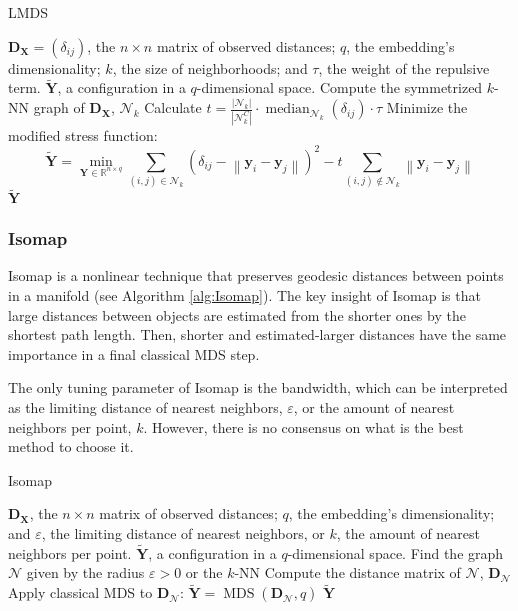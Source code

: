 \begin{algorithm}
    \caption{LMDS}
    \label{alg:LMDS}
    
    \begin{algorithmic}[1]
    \REQUIRE $\mathbf{D_X} = (\delta_{ij})$, the $n \times n$ matrix of observed distances; $q$, the embedding's dimensionality; $k$, the size of neighborhoods; and $\tau$, the weight of the repulsive term.
    \ENSURE $\mathbf{\tilde{Y}}$, a configuration in a $q$-dimensional space.
    \STATE Compute the symmetrized $k$-NN graph of $\mathbf{D_X}$, $\mathcal{N}_k$
    \STATE Calculate $t=\frac{|\mathcal{N}_k|}{\left|\mathcal{N}_k^C\right|} \cdot \operatorname{median}_{\mathcal{N}_k}\left(\delta_{ij}\right) \cdot \tau$
    \STATE Minimize the modified stress function:
    $$
    \mathbf{\tilde{Y}} = \min_{\mathbf{Y} \in \mathbb{R}^{n\times q}} \sum_{(i, j) \in \mathcal{N}_k}\left(\delta_{ij}-\left\|\mathbf{y}_i-\mathbf{y}_j\right\|\right)^2 - t \sum_{(i, j) \notin \mathcal{N}_k}\left\|\mathbf{y}_i-\mathbf{y}_j\right\|
    $$
    \RETURN $\mathbf{\tilde{Y}}$
    \end{algorithmic}
\end{algorithm}

\subsubsection{Isomap}

Isomap \citep{Tenenbaum2000} is a nonlinear technique that preserves geodesic distances between points in a manifold (see Algorithm \ref{alg:Isomap}). The key insight of Isomap is that large distances between objects are estimated from the shorter ones by the shortest path length. Then, shorter and estimated-larger distances have the same importance in a final classical MDS step.

The only tuning parameter of Isomap is the bandwidth, which can be interpreted as the limiting distance of nearest neighbors, $\varepsilon$,  or the amount of nearest neighbors per point, $k$. However, there is no consensus on what is the best method to choose it.

\begin{algorithm}
    \caption{Isomap}
    \label{alg:Isomap}

    \begin{algorithmic}[1]
    \REQUIRE $\mathbf{D_X}$, the $n \times n$ matrix of observed distances; $q$, the embedding's dimensionality; and $\varepsilon$, the limiting distance of nearest neighbors, or $k$, the amount of nearest neighbors per point.
    \ENSURE $\mathbf{\tilde{Y}}$, a configuration in a $q$-dimensional space.
    \STATE Find the graph $\mathcal{N}$ given by the radius $\varepsilon>0$ or the $k$-NN
    \STATE Compute the distance matrix of $\mathcal{N}$, $\mathbf{D}_{\mathcal{N}}$
    \STATE Apply classical MDS to $\mathbf{D}_{\mathcal{N}}$: $\mathbf{\tilde{Y}} = \operatorname{MDS}(\mathbf{D}_{\mathcal{N}}, q)$
    \RETURN $\mathbf{\tilde{Y}}$
    
    \end{algorithmic}
\end{algorithm}


